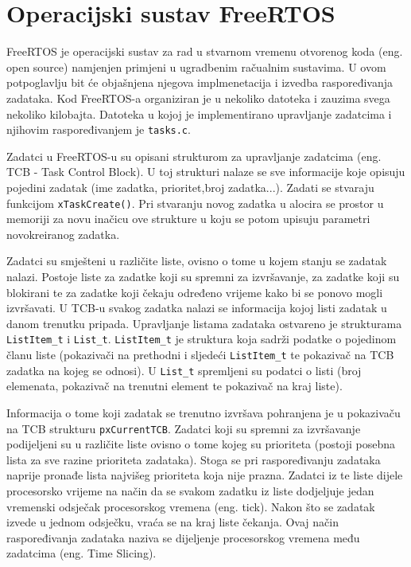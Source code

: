 \documentclass[../zavrsni.tex]{subfiles}
\begin{document}
\section{Operacijski sustav FreeRTOS}

FreeRTOS je operacijski sustav za rad u stvarnom vremenu otvorenog koda (eng. open source) namjenjen primjeni u ugradbenim 
račualnim sustavima. U ovom potpoglavlju bit će objašnjena 
njegova implmenetacija i izvedba raspoređivanja zadataka. Kod FreeRTOS-a organiziran je u nekoliko datoteka i zauzima 
svega nekoliko kilobajta. Datoteka u kojoj je implementirano upravljanje zadatcima i njihovim raspoređivanjem je \texttt{tasks.c}.

Zadatci u FreeRTOS-u su opisani strukturom za upravljanje zadatcima (eng. TCB - Task Control Block). U toj strukturi nalaze
se sve informacije koje opisuju pojedini zadatak (ime zadatka, prioritet,broj zadatka...).  
Zadati se stvaraju funkcijom \texttt{xTaskCreate()}.
Pri stvaranju novog zadatka u alocira se prostor u memoriji za novu inačicu 
ove strukture u koju se potom upisuju parametri novokreiranog zadatka.

Zadatci su smješteni u različite liste, ovisno o tome u kojem stanju se zadatak nalazi. Postoje liste za zadatke koji su
spremni za izvršavanje, za zadatke koji su blokirani te za zadatke koji čekaju određeno vrijeme kako bi se ponovo mogli izvršavati.
U TCB-u svakog zadatka nalazi se informacija kojoj listi zadatak u danom trenutku pripada. Upravljanje listama zadataka ostvareno je strukturama
\texttt{ListItem\_t} i \texttt{List\_t}. \texttt{ListItem\_t} je struktura koja sadrži podatke o pojedinom članu liste (pokazivači na prethodni i 
sljedeći \texttt{ListItem\_t} te 
pokazivač na TCB zadatka na kojeg se odnosi). U \texttt{List\_t} spremljeni su podatci o listi (broj elemenata, pokazivač na trenutni element te
pokazivač na kraj liste).

Informacija o tome koji zadatak se trenutno izvršava pohranjena je u pokazivaču na TCB strukturu \texttt{pxCurrentTCB}.
Zadatci koji su spremni za izvršavanje podijeljeni su u različite liste ovisno o tome kojeg su prioriteta (postoji posebna lista
 za sve razine prioriteta zadataka).
Stoga se pri raspoređivanju zadataka naprije pronađe lista najvišeg prioriteta koja nije prazna. Zadatci iz te liste dijele 
procesorsko vrijeme na način da se svakom zadatku iz liste dodjeljuje jedan vremenski odsječak procesorskog vremena (eng. tick).
Nakon što se zadatak izvede u jednom odsječku, vraća se na kraj liste čekanja. Ovaj način raspoređivanja zadataka naziva se dijeljenje
procesorskog vremena među zadatcima (eng. Time Slicing).
\end{document}
